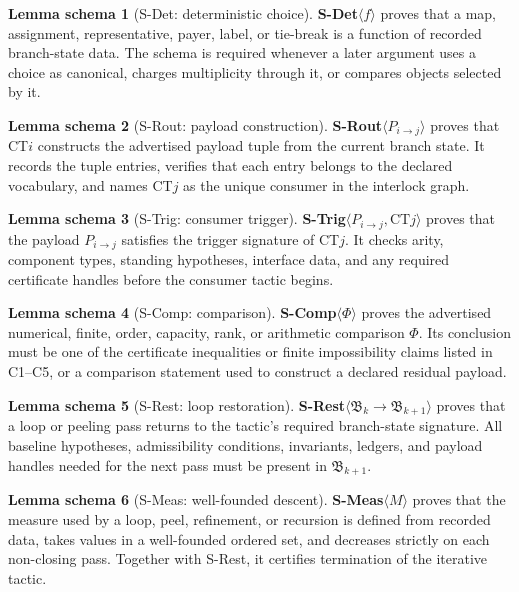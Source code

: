 \documentclass[
  11pt,
]{article}
\theoremstyle{definition}
\newtheorem{lemmaschema}{Lemma schema}[section]
\begin{document}
\begin{lemmaschema}[S-Det: deterministic choice]\label{schema:s-det}
\textbf{S-Det}\(\langle f\rangle\) proves that a map, assignment,
representative, payer, label, or tie-break is a function of recorded
branch-state data.  The schema is required whenever a later argument
uses a choice as canonical, charges multiplicity through it, or compares
objects selected by it.
\end{lemmaschema}

\begin{lemmaschema}[S-Rout: payload construction]\label{schema:s-rout}
\textbf{S-Rout}\(\langle P_{i\to j}\rangle\) proves that CT\(i\)
constructs the advertised payload tuple from the current branch state.
It records the tuple entries, verifies that each entry belongs to the
declared vocabulary, and names CT\(j\) as the unique consumer in the
interlock graph.
\end{lemmaschema}

\begin{lemmaschema}[S-Trig: consumer trigger]\label{schema:s-trig}
\textbf{S-Trig}\(\langle P_{i\to j},\mathrm{CT}j\rangle\) proves that
the payload \(P_{i\to j}\) satisfies the trigger signature of CT\(j\).
It checks arity, component types, standing hypotheses, interface data,
and any required certificate handles before the consumer tactic begins.
\end{lemmaschema}

\begin{lemmaschema}[S-Comp: comparison]\label{schema:s-comp}
\textbf{S-Comp}\(\langle \Phi\rangle\) proves the advertised numerical,
finite, order, capacity, rank, or arithmetic comparison \(\Phi\).  Its
conclusion must be one of the certificate inequalities or finite
impossibility claims listed in C1--C5, or a comparison statement used to
construct a declared residual payload.
\end{lemmaschema}

\begin{lemmaschema}[S-Rest: loop restoration]\label{schema:s-rest}
\textbf{S-Rest}\(\langle \mathfrak B_k\to\mathfrak B_{k+1}\rangle\)
proves that a loop or peeling pass returns to the tactic's required
branch-state signature.  All baseline hypotheses, admissibility
conditions, invariants, ledgers, and payload handles needed for the next
pass must be present in \(\mathfrak B_{k+1}\).
\end{lemmaschema}

\begin{lemmaschema}[S-Meas: well-founded descent]\label{schema:s-meas}
\textbf{S-Meas}\(\langle M\rangle\) proves that the measure used by a
loop, peel, refinement, or recursion is defined from recorded data,
takes values in a well-founded ordered set, and decreases strictly on
each non-closing pass.  Together with S-Rest, it certifies termination of
the iterative tactic.
\end{lemmaschema}
\end{document}
